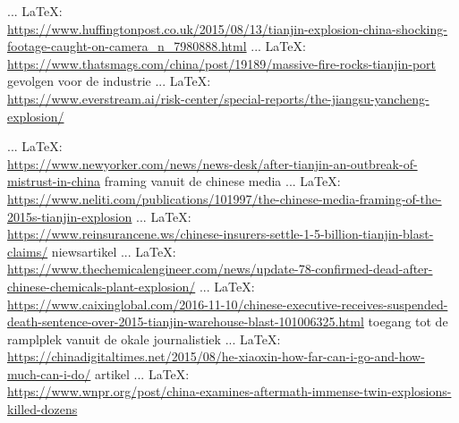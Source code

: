 \begin{thebibliography}{99}
{{{			 ... \LaTeX:\\ \url{https://www.huffingtonpost.co.uk/2015/08/13/tianjin-explosion-china-shocking-footage-caught-on-camera_n_7980888.html}
			 ... \LaTeX:\\ \url{https://www.thatsmags.com/china/post/19189/massive-fire-rocks-tianjin-port}
			gevolgen voor de industrie
			 ... \LaTeX:\\ \url{https://www.everstream.ai/risk-center/special-reports/the-jiangsu-yancheng-explosion/}
			
			 ... \LaTeX:\\ \url{https://www.newyorker.com/news/news-desk/after-tianjin-an-outbreak-of-mistrust-in-china}
			framing vanuit de chinese media
			 ... \LaTeX:\\ \url{https://www.neliti.com/publications/101997/the-chinese-media-framing-of-the-2015s-tianjin-explosion}
			 ... \LaTeX:\\ \url{https://www.reinsurancene.ws/chinese-insurers-settle-1-5-billion-tianjin-blast-claims/}
			niewsartikel
			 ... \LaTeX:\\ \url{https://www.thechemicalengineer.com/news/update-78-confirmed-dead-after-chinese-chemicals-plant-explosion/}
			 ... \LaTeX:\\ \url{https://www.caixinglobal.com/2016-11-10/chinese-executive-receives-suspended-death-sentence-over-2015-tianjin-warehouse-blast-101006325.html}
			toegang tot de ramplplek vanuit de okale journalistiek
			 ... \LaTeX:\\ \url{https://chinadigitaltimes.net/2015/08/he-xiaoxin-how-far-can-i-go-and-how-much-can-i-do/}
			artikel
			 ... \LaTeX:\\ \url{https://www.wnpr.org/post/china-examines-aftermath-immense-twin-explosions-killed-dozens}
			
}}}
\end{thebibliography}
